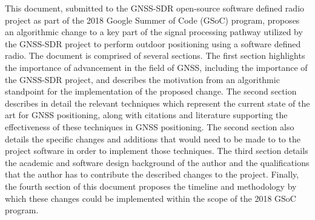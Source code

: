 This document, submitted to the GNSS-SDR open-source software defined radio project as part of the 2018 Google Summer of Code (GSoC) program, proposes an algorithmic change to a key part of the signal processing pathway utilized by the GNSS-SDR project to perform outdoor positioning using a software defined radio. The document is comprised of several sections. The first section highlights the importance of advancement in the field of GNSS, including the importance of the GNSS-SDR project, and describes the motivation from an algorithmic standpoint for the implementation of the proposed change. The second section describes in detail the relevant techniques which represent the current state of the art for GNSS positioning, along with citations and literature supporting the effectiveness of these techniques in GNSS positioning. The second section also details the specific changes and additions that would need to be made to to the project software in order to implement those techniques. The third section details the academic and software design background of the author and the qualifications that the author has to contribute the described changes to the project. Finally, the fourth section of this document proposes the timeline and methodology by which these changes could be implemented within the scope of the 2018 GSoC program.

